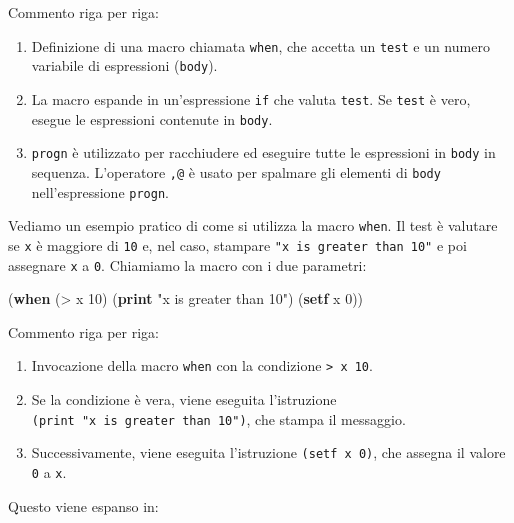 \documentclass[
  letterpaper,
]{scrbook}
\newenvironment{Shaded}{\begin{snugshade}}{\end{snugshade}}
\newcommand{\DecValTok}[1]{\textcolor[rgb]{0.68,0.00,0.00}{#1}}
\newcommand{\KeywordTok}[1]{\textcolor[rgb]{0.00,0.23,0.31}{\textbf{#1}}}
\newcommand{\NormalTok}[1]{\textcolor[rgb]{0.00,0.23,0.31}{#1}}
\newcommand{\OperatorTok}[1]{\textcolor[rgb]{0.37,0.37,0.37}{#1}}
\newcommand{\StringTok}[1]{\textcolor[rgb]{0.13,0.47,0.30}{#1}}
\providecommand{\tightlist}{%
  \setlength{\itemsep}{0pt}\setlength{\parskip}{0pt}}\usepackage{longtable,booktabs,array}
\begin{document}
Commento riga per riga:

\begin{enumerate}
\def\labelenumi{\arabic{enumi}.}
\tightlist
\item
  Definizione di una macro chiamata \texttt{when}, che accetta un
  \texttt{test} e un numero variabile di espressioni (\texttt{body}).
\item
  La macro espande in un'espressione \texttt{if} che valuta
  \texttt{test}. Se \texttt{test} è vero, esegue le espressioni
  contenute in \texttt{body}.
\item
  \texttt{progn} è utilizzato per racchiudere ed eseguire tutte le
  espressioni in \texttt{body} in sequenza. L'operatore \texttt{,@} è
  usato per spalmare gli elementi di \texttt{body} nell'espressione
  \texttt{progn}.
\end{enumerate}

Vediamo un esempio pratico di come si utilizza la macro \texttt{when}.
Il test è valutare se \texttt{x} è maggiore di \texttt{10} e, nel caso,
stampare \texttt{"x\ is\ greater\ than\ 10"} e poi assegnare \texttt{x}
a \texttt{0}. Chiamiamo la macro con i due parametri:

\begin{Shaded}
\begin{Highlighting}[]
\NormalTok{(}\KeywordTok{when}\NormalTok{ (}\OperatorTok{\textgreater{}}\NormalTok{ x }\DecValTok{10}\NormalTok{)                      }
\NormalTok{  (}\KeywordTok{print} \StringTok{"x is greater than 10"}\NormalTok{)     }
\NormalTok{  (}\KeywordTok{setf}\NormalTok{ x }\DecValTok{0}\NormalTok{))                        }
\end{Highlighting}
\end{Shaded}

Commento riga per riga:

\begin{enumerate}
\def\labelenumi{\arabic{enumi}.}
\tightlist
\item
  Invocazione della macro \texttt{when} con la condizione
  \texttt{\textgreater{}\ x\ 10}.
\item
  Se la condizione è vera, viene eseguita l'istruzione
  \texttt{(print\ "x\ is\ greater\ than\ 10")}, che stampa il messaggio.
\item
  Successivamente, viene eseguita l'istruzione \texttt{(setf\ x\ 0)},
  che assegna il valore \texttt{0} a \texttt{x}.
\end{enumerate}

Questo viene espanso in:
\end{document}
